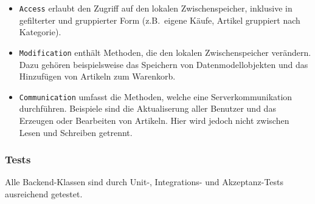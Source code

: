 \begin{itemize}
	\item \texttt{Access} erlaubt den Zugriff auf den lokalen Zwischenspeicher, inklusive in gefilterter und gruppierter Form (z.B.\ eigene Käufe, Artikel gruppiert nach Kategorie).
	\item \texttt{Modification} enthält Methoden, die den lokalen Zwischenspeicher verändern.
	Dazu gehören beispielsweise das Speichern von Datenmodellobjekten und das Hinzufügen von Artikeln zum Warenkorb.
	\item \texttt{Communication} umfasst die Methoden, welche eine Serverkommunikation durchführen.
	Beispiele sind die Aktualiserung aller Benutzer und das Erzeugen oder Bearbeiten von Artikeln.
	Hier wird jedoch nicht zwischen Lesen und Schreiben getrennt.
\end{itemize}

\subsubsection{Tests}

Alle Backend-Klassen sind durch Unit-, Integrations- und Akzeptanz-Tests ausreichend getestet.
